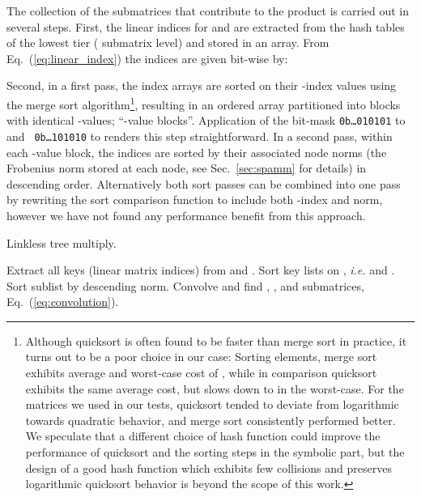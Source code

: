 The collection of the submatrices that contribute to the product is carried
out in several steps. First, the linear indices  for  and  are
extracted from the hash tables of the lowest tier ( submatrix
level) and stored in an array. From Eq.~(\ref{eq:linear_index}) the indices
are given bit-wise by:


\noindent Second, in a first pass, the index arrays are sorted on their
-index values using the merge sort algorithm\footnote{Although quicksort is
often found to be faster than merge sort in practice, it turns out to be a
poor choice in our case: Sorting  elements, merge sort exhibits average and
worst-case cost of , while in comparison
quicksort exhibits the same average cost, but slows down to  in the worst-case. For the matrices we used in our
tests, quicksort tended to deviate from logarithmic towards quadratic
behavior, and merge sort consistently performed better.  We speculate that a
different choice of hash function could improve the performance of quicksort
and the sorting steps in the symbolic part, but the design of a good hash
function which exhibits few collisions and preserves logarithmic quicksort
behavior is beyond the scope of this work.}, resulting in an ordered array
partitioned into blocks with identical -values; ``-value blocks''.
Application of the bit-mask {\tt 0b\dots010101} to  and {\tt
0b\dots 101010} to  renders this step straightforward. In a second
pass, within each -value block, the indices are sorted by their associated
node norms (the Frobenius norm stored at each node, see Sec.~\ref{sec:spamm}
for details) in descending order.  Alternatively both sort passes can be
combined into one pass by rewriting the sort comparison function to include
both -index and norm, however we have not found any performance benefit
from this approach.

\begin{algorithm}
\caption{\label{algorithm:spamm_multiply} Linkless tree \SpAMM{} multiply.}
\begin{algorithmic}[1]
\STATE Extract all keys (linear matrix indices) from  and .
\STATE Sort key lists on , {\it i.e.}  and .
  \STATE Sort sublist by descending norm.
\ENDFOR
\STATE Convolve and find , , and  submatrices,
Eq.~(\ref{eq:convolution}).
  \STATE 
\ENDFOR
\end{algorithmic}
\end{algorithm}

